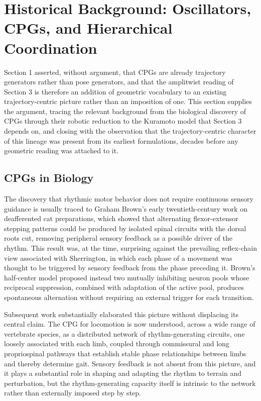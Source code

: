 \documentclass[12pt]{article}
\begin{document}
\section{Historical Background: Oscillators, CPGs, and Hierarchical Coordination}

Section 1 asserted, without argument, that CPGs are already trajectory generators rather than pose generators, and that the amplitwist reading of Section 3 is therefore an addition of geometric vocabulary to an existing trajectory-centric picture rather than an imposition of one. This section supplies the argument, tracing the relevant background from the biological discovery of CPGs through their robotic reduction to the Kuramoto model that Section 3 depends on, and closing with the observation that the trajectory-centric character of this lineage was present from its earliest formulations, decades before any geometric reading was attached to it.

\subsection{CPGs in Biology}

The discovery that rhythmic motor behavior does not require continuous sensory guidance is usually traced to Graham Brown's early twentieth-century work on deafferented cat preparations, which showed that alternating flexor-extensor stepping patterns could be produced by isolated spinal circuits with the dorsal roots cut, removing peripheral sensory feedback as a possible driver of the rhythm. This result was, at the time, surprising against the prevailing reflex-chain view associated with Sherrington, in which each phase of a movement was thought to be triggered by sensory feedback from the phase preceding it. Brown's half-center model proposed instead two mutually inhibiting neuron pools whose reciprocal suppression, combined with adaptation of the active pool, produces spontaneous alternation without requiring an external trigger for each transition.

Subsequent work substantially elaborated this picture without displacing its central claim. The CPG for locomotion is now understood, across a wide range of vertebrate species, as a distributed network of rhythm-generating circuits, one loosely associated with each limb, coupled through commissural and long propriospinal pathways that establish stable phase relationships between limbs and thereby determine gait. Sensory feedback is not absent from this picture, and it plays a substantial role in shaping and adapting the rhythm to terrain and perturbation, but the rhythm-generating capacity itself is intrinsic to the network rather than externally imposed step by step.
\end{document}

